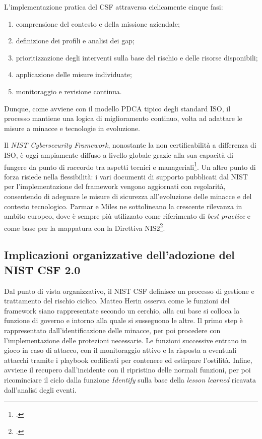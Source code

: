 L’implementazione pratica del CSF attraversa ciclicamente cinque fasi: 
\begin{enumerate}
    \item comprensione del contesto e della missione aziendale;
    \item definizione dei profili e analisi dei gap;
    \item prioritizzazione degli interventi sulla base del rischio e delle risorse disponibili;
    \item applicazione delle misure individuate;
    \item monitoraggio e revisione continua.
\end{enumerate}

Dunque, come avviene con il modello PDCA tipico degli standard ISO, il processo mantiene una logica di miglioramento 
continuo, volta ad adattare le misure a minacce e tecnologie in evoluzione.

Il \textit{NIST Cybersecurity Framework}, nonostante la non certificabilità a differenza di ISO,
è oggi ampiamente diffuso a livello globale grazie alla sua 
capacità di fungere da punto di raccordo tra aspetti tecnici e manageriali\footcite[p. 3]{mcintosh}. 
Un altro punto di forza risiede nella flessibilità: i vari documenti di supporto pubblicati dal NIST per 
l’implementazione del framework vengono aggiornati con regolarità, consentendo di adeguare le misure 
di sicurezza all’evoluzione delle minacce e del contesto tecnologico.
Parmar e Miles ne sottolineano la crescente rilevanza in ambito europeo, dove è sempre 
più utilizzato come riferimento di \textit{best practice} e come base per la mappatura con la Direttiva 
NIS2\footcite[p. 12]{parmar-miles-csf}.


\subsection{Implicazioni organizzative dell'adozione del NIST CSF 2.0}
Dal punto di vista organizzativo, il NIST CSF definisce un processo di gestione e trattamento del rischio
ciclico. Matteo Herin osserva come le funzioni del framework siano rappresentate secondo un cerchio, alla cui base si colloca la 
funzione di governo e intorno alla quale si susseguono le altre. Il primo step è rappresentato 
dall'identificazione delle minacce, per poi procedere con l'implementazione delle protezioni necessarie.
Le funzioni successive entrano in gioco in caso di attacco, con il monitoraggio attivo e
la risposta a eventuali attacchi tramite i playbook codificati per contenere ed estirpare l'ostilità.
Infine, avviene il recupero dall'incidente con il ripristino delle normali funzioni, per poi ricominciare
il ciclo dalla funzione \textit{Identify} sulla base della \textit{lesson learned} ricavata
dall'analisi degli eventi.

